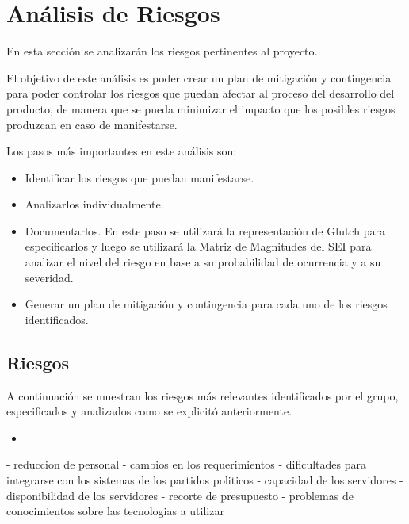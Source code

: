 \section{An\'alisis de Riesgos}

En esta secci\'on se analizar\'an los riesgos pertinentes al proyecto.

El objetivo de este an\'alisis es poder crear un plan de mitigaci\'on y contingencia para poder controlar los riesgos que puedan afectar al proceso del desarrollo del producto, de manera que se pueda minimizar el impacto que los posibles riesgos produzcan en caso de manifestarse.

Los pasos m\'as importantes en este an\'alisis son:

\begin{itemize}
\item Identificar los riesgos que puedan manifestarse.
\item Analizarlos individualmente.
\item Documentarlos. En este paso se utilizar\'a la representaci\'on de Glutch para especificarlos y luego se utilizar\'a la Matriz de Magnitudes del SEI para analizar el nivel del riesgo en base a su probabilidad de ocurrencia y a su severidad.
\item Generar un plan de mitigaci\'on y contingencia para cada uno de los riesgos identificados.
\end{itemize}


\subsection{Riesgos}


A continuaci\'on se muestran los riesgos m\'as relevantes identificados por el grupo, especificados y analizados como se explicit\'o anteriormente.

\begin{itemize}
\item 
\end{itemize}

- reduccion de personal
- cambios en los requerimientos
- dificultades para integrarse con los sistemas de los partidos politicos
- capacidad de los servidores
- disponibilidad de los servidores
- recorte de presupuesto
- problemas de conocimientos sobre las tecnologias a utilizar